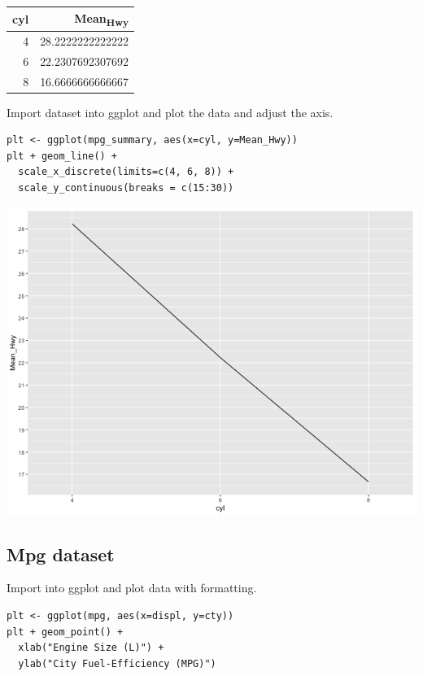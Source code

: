\documentclass[11pt]{article}
\begin{document}
\begin{org}
\begin{center}
\begin{tabular}{rr}
cyl & Mean\textsubscript{Hwy}\\
\hline
4 & 28.2222222222222\\
6 & 22.2307692307692\\
8 & 16.6666666666667\\
\end{tabular}
\end{center}
\end{org}

Import dataset into ggplot and plot the data and adjust the axis.

\begin{verbatim}
plt <- ggplot(mpg_summary, aes(x=cyl, y=Mean_Hwy))
plt + geom_line() +
  scale_x_discrete(limits=c(4, 6, 8)) +
  scale_y_continuous(breaks = c(15:30))
\end{verbatim}

\begin{org}
\begin{center}
\includegraphics[width=.9\linewidth]{./resources/mpg_summary.png}
\end{center}
\end{org}

\subsection{Mpg dataset}
\label{sec:orgaaad840}

Import into ggplot and plot data with formatting.

\begin{verbatim}
plt <- ggplot(mpg, aes(x=displ, y=cty))
plt + geom_point() +
  xlab("Engine Size (L)") +
  ylab("City Fuel-Efficiency (MPG)")
\end{verbatim}
\end{document}
